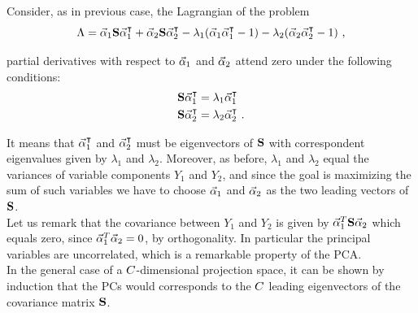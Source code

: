 Consider, as in previous case, the Lagrangian of the problem
\begin{equation}
\Lambda = \vec{\alpha}_1 \textbf{S} \vec{\alpha}_1^\intercal + \vec{\alpha}_2\textbf{S} \vec{\alpha}_2^\intercal - \lambda_1(\vec{\alpha}_1\vec{\alpha}_1^\intercal -1) - \lambda_2(\vec{\alpha}_2\vec{\alpha}_2^\intercal -1) \mbox{ ,}
\end{equation}

partial derivatives with respect to $\vec{\alpha}_1$ and $\vec{\alpha}_2$ attend zero under the following conditions:
\begin{align}
\textbf{S}  \vec{\alpha}_1^\intercal &= \lambda_1\vec{\alpha}_1^\intercal\\
\textbf{S}  \vec{\alpha}_2^\intercal &= \lambda_2\vec{\alpha}_2^\intercal \mbox{ .}
\end{align}

It means that $\vec{\alpha}_1^\intercal$ and $\vec{\alpha}_2^\intercal$ must be eigenvectors of $\textbf{S}$ with correspondent eigenvalues given by $\lambda_1$ and $\lambda_2$. Moreover, as before, $\lambda_1$ and $\lambda_2$ equal the variances of variable components $Y_1$ and $Y_2$, and since the goal is maximizing the sum of such variables we have to choose $\vec{\alpha}_1$ and $\vec{\alpha}_2$ as the two leading vectors of $\textbf{S}$.\\
Let us remark that the covariance between $Y_1$ and $Y_2$ is given by $\vec{\alpha}_1^T\textbf{S} \vec{\alpha}_2$ which equals zero, since $\vec{\alpha}_1^T\vec{\alpha}_2 = 0$, by orthogonality. In particular the principal variables are uncorrelated, which is a remarkable property of the PCA. \\

In the general case of a $C$-dimensional projection space, it can be shown by induction that the PCs would corresponds to the $C$ leading eigenvectors of the covariance matrix $\textbf{S}$.



